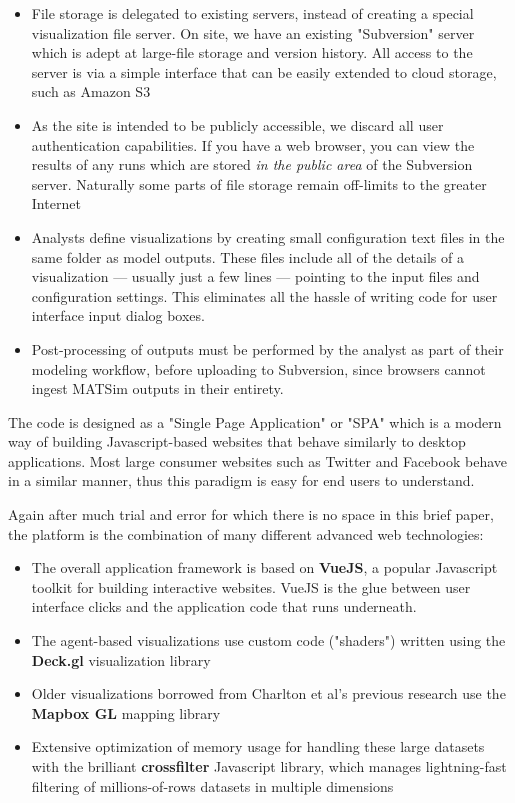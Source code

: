 \documentclass[3p,times,procedia]{elsarticle}
\begin{document}
\begin{itemize}
  \item File storage is delegated to existing servers, instead of creating a special visualization file server. On site, we have an existing "Subversion" server \cite{Collins-SussmanEtc2008SubversionBook} which is adept at large-file storage and version history. All access to the server is via a simple interface that can be easily extended to cloud storage, such as Amazon S3
  \item As the site is intended to be publicly accessible, we discard all user authentication capabilities. If you have a web browser, you can view the results of any runs which are stored \emph{in the public area} of the Subversion server. Naturally some parts of file storage remain off-limits to the greater Internet
  \item Analysts define visualizations by creating small configuration text files in the same folder as model outputs. These files include all of the details of a visualization --- usually just a few lines --- pointing to the input files and configuration settings. This eliminates all the hassle of writing code for user interface input dialog boxes.
  \item Post-processing of outputs must be performed by the analyst as part of their modeling workflow, before uploading to Subversion, since browsers cannot ingest MATSim outputs in their entirety.
\end{itemize}

The code is designed as a "Single Page Application" or "SPA" which is a modern way of building Javascript-based websites that behave similarly to desktop applications. Most large consumer websites such as Twitter and Facebook behave in a similar manner, thus this paradigm is easy for end users to understand.

Again after much trial and error for which there is no space in this brief paper, the platform is the combination of many different advanced web technologies:

\begin{itemize}
  \item The overall application framework is based on \textbf{VueJS}, a popular Javascript toolkit for building interactive websites. VueJS is the glue between user interface clicks and the application code that runs underneath.
  \item The agent-based visualizations use custom code ("shaders") written using the \textbf{Deck.gl} visualization library
  \item Older visualizations borrowed from Charlton et al's previous research use the \textbf{Mapbox GL} mapping library
  \item Extensive optimization of memory usage for handling these large datasets with the brilliant \textbf{crossfilter} Javascript library, which manages lightning-fast filtering of millions-of-rows datasets in multiple dimensions
\end{itemize}
\end{document}
